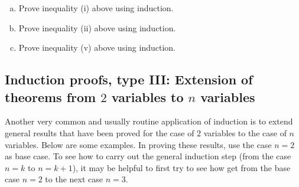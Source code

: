 \begin{exercise}
\begin{enumerate}[(a)]
\item
Prove inequality (i) above using induction.
\item
Prove inequality (ii) above using induction.
\item
Prove inequality (v) above using induction.
\end{enumerate}
\end{exercise}

%
%
%
%


\subsection*{Induction proofs, type III:
Extension of theorems from $2$ variables to $n$ variables}
Another very common and usually routine application of induction is to
extend general results that have been proved for the case of $2$
variables to the case of $n$ variables.  Below are some examples.
In proving these results, use the case $n=2$ as base case. To see how to
carry out the general induction step (from the case $n=k$ to
$n=k+1$), it may be  helpful to first try to see how get from the base
case $n=2$ to the next case $n=3$.
\medskip

